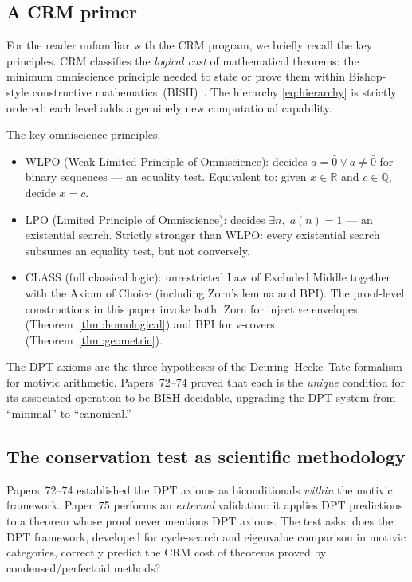 \documentclass[12pt, a4paper]{article}
\theoremstyle{plain}
\theoremstyle{definition}
\theoremstyle{remark}
\newcommand{\BISH}{\mathrm{BISH}}
\newcommand{\WLPO}{\mathrm{WLPO}}
\newcommand{\LPO}{\mathrm{LPO}}
\newcommand{\CLASS}{\mathrm{CLASS}}
\newcommand{\CRM}{\mathrm{CRM}}
\newcommand{\BPI}{\mathrm{BPI}}
\begin{document}
\subsection{A CRM primer}

For the reader unfamiliar with the CRM program, we briefly recall
the key principles.  $\CRM$ classifies the \emph{logical cost} of
mathematical theorems: the minimum omniscience principle needed to
state or prove them within Bishop-style constructive
mathematics~($\BISH$)~\cite{bridges-richman}.  The hierarchy
\eqref{eq:hierarchy} is strictly ordered: each level adds a
genuinely new computational capability.

The key omniscience principles:
\begin{itemize}
  \item $\WLPO$ (Weak Limited Principle of Omniscience): decides
    $a = \bar{0} \lor a \neq \bar{0}$ for binary sequences ---
    an equality test.  Equivalent to: given $x \in \mathbb{R}$
    and $c \in \mathbb{Q}$, decide $x = c$.
  \item $\LPO$ (Limited Principle of Omniscience): decides
    $\exists n,\; a(n) = 1$ --- an existential search.
    Strictly stronger than $\WLPO$: every existential search
    subsumes an equality test, but not conversely.
  \item $\CLASS$ (full classical logic): unrestricted Law of
    Excluded Middle together with the Axiom of Choice (including
    Zorn's lemma and $\BPI$).  The proof-level constructions
    in this paper invoke both: Zorn for injective envelopes
    (Theorem~\ref{thm:homological}) and $\BPI$ for v-covers
    (Theorem~\ref{thm:geometric}).
\end{itemize}
The DPT axioms are the three hypotheses of the Deuring--Hecke--Tate
formalism for motivic arithmetic.  Papers~72--74 proved that each
is the \emph{unique} condition for its associated operation to be
$\BISH$-decidable, upgrading the DPT system from ``minimal'' to
``canonical.''

\subsection{The conservation test as scientific methodology}

Papers~72--74 established the DPT axioms as biconditionals
\emph{within} the motivic framework.  Paper~75 performs an
\emph{external} validation: it applies DPT predictions to a
theorem whose proof never mentions DPT axioms.  The test asks:
does the DPT framework, developed for cycle-search and eigenvalue
comparison in motivic categories, correctly predict the CRM cost
of theorems proved by condensed/perfectoid methods?
\end{document}
